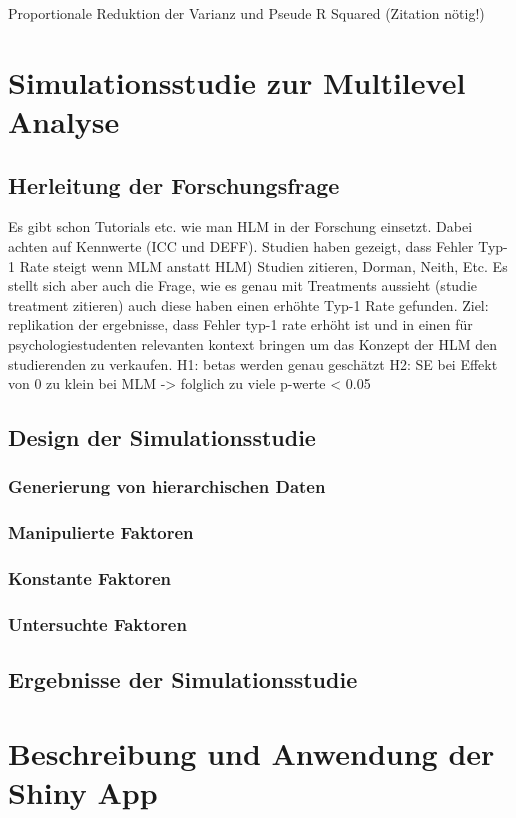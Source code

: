 \documentclass[12pt]{article}\usepackage[]{graphicx}\usepackage[]{color}
\numberwithin{equation}{section}
\begin{document}
Proportionale Reduktion der Varianz und Pseude R Squared (Zitation nötig!)

\section{Simulationsstudie zur Multilevel Analyse}
\subsection{Herleitung der Forschungsfrage}
Es gibt schon Tutorials etc. wie man HLM in der Forschung einsetzt. Dabei achten auf Kennwerte (ICC und DEFF). Studien haben gezeigt, dass Fehler Typ-1 Rate steigt wenn MLM anstatt HLM) Studien zitieren, Dorman, Neith, Etc. Es stellt sich aber auch die Frage, wie es genau mit Treatments aussieht (studie treatment zitieren) auch diese haben einen erhöhte Typ-1 Rate gefunden. Ziel: replikation der ergebnisse, dass Fehler typ-1 rate erhöht ist und in einen für psychologiestudenten relevanten kontext bringen um das Konzept der HLM den studierenden zu verkaufen. 
H1: betas werden genau geschätzt
H2: SE bei Effekt von 0 zu klein bei MLM -> folglich zu viele p-werte < 0.05
\subsection{Design der Simulationsstudie}
\subsubsection{Generierung von hierarchischen Daten}
\subsubsection{Manipulierte Faktoren}
\subsubsection{Konstante Faktoren}
\subsubsection{Untersuchte Faktoren}
\subsection{Ergebnisse der Simulationsstudie}

\section{Beschreibung und Anwendung der Shiny App}
\end{document}
